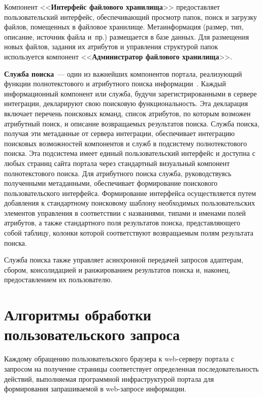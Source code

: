 \begin{multicols}{2}
 Компонент <<\textbf{Интерфейс файлового хранилища}>> предоставляет
пользовательский интерфейс, обеспечивающий просмотр папок, поиск и загрузку файлов,
помещенных в файловое хранилище. Метаинформация (размер, тип, описание, источник
файла и~пр.) размещается в базе данных. Для размещения новых файлов, задания их
атрибутов и управления структурой папок используется компонент
<<\textbf{Администратор файлового хранилища}>>.

 \textbf{Служба поиска}~--- один из важнейших компонентов портала, реализующий
функции полнотекстового и атрибутного поиска информации~\cite{12bos}. Каждый
информационный компонент или служба, будучи зарегистрированными в сервере
ин\-те\-гра\-ции, декларируют свою поисковую функциональность. Эта декларация включает
перечень %
 по\-исковых команд, список атрибутов, по которым возможен атрибутный поиск,
и описание возвращаемых результатов поиска. Служба поиска, по\-лучая эти метаданные от
сервера интеграции, обеспечивает интеграцию поисковых возможностей компонентов и
служб в подсистему полнотекстового поиска. Эта подсистема имеет единый
пользовательский интерфейс и доступна с любых страниц сайта портала через
стандартный визуальный компонент полнотекстового поиска. Для атрибутного поиска
служба, руководствуясь полученными метаданными, обеспечивает формирование
поискового пользовательского интерфейса. Формирование интерфейса осуществляется
путем добавления к стандартному поисковому шаблону необходимых пользовательских
элементов управления в соответствии с названиями, типами и именами полей атрибутов, а
также стандартного поля результатов поиска, представляющего собой таблицу, колонки
которой соответствуют возвращаемым полям результата поиска.

 Служба поиска также управляет асинхронной передачей запросов адаптерам,
сбором, консолидацией и ранжированием результатов поиска и, наконец,
предоставлением их пользователю.

\section{Алгоритмы обработки пользовательского запроса} %

 Каждому обращению пользовательского браузера к web-серверу портала с
запросом на получение страницы соответствует определенная последовательность
действий, выполняемая про\-грам\-мной инфраструктурой портала для формирования
запрашиваемой в web-запросе информации.


\end{multicols}

